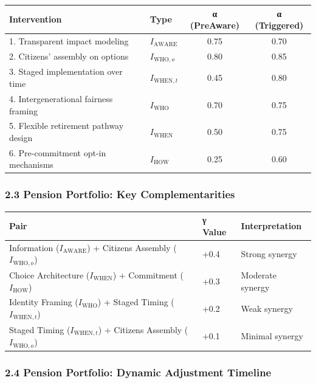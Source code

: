 \begin{center}
\begin{tabular}{@{}llcc@{}}
\toprule
\textbf{Intervention} & \textbf{Type} & \textbf{α (PreAware)} & \textbf{α (Triggered)} \\
\midrule
1. Transparent impact modeling & $I_{\text{AWARE}}$ & 0.75 & 0.70 \\
2. Citizens' assembly on options & $I_{\text{WHO},o}$ & 0.80 & 0.85 \\
3. Staged implementation over time & $I_{\text{WHEN},t}$ & 0.45 & 0.80 \\
4. Intergenerational fairness framing & $I_{\text{WHO}}$ & 0.70 & 0.75 \\
5. Flexible retirement pathway design & $I_{\text{WHEN}}$ & 0.50 & 0.75 \\
6. Pre-commitment opt-in mechanisms & $I_{\text{HOW}}$ & 0.25 & 0.60 \\
\midrule
\end{tabular}
\end{center}

\subsubsection*{2.3 Pension Portfolio: Key Complementarities}

\begin{center}
\begin{tabular}{@{}lll@{}}
\toprule
\textbf{Pair} & \textbf{γ Value} & \textbf{Interpretation} \\
\midrule
Information ($I_{\text{AWARE}}$) + Citizens Assembly ($I_{\text{WHO},o}$) & +0.4 & Strong synergy \\
Choice Architecture ($I_{\text{WHEN}}$) + Commitment ($I_{\text{HOW}}$) & +0.3 & Moderate synergy \\
Identity Framing ($I_{\text{WHO}}$) + Staged Timing ($I_{\text{WHEN},t}$) & +0.2 & Weak synergy \\
Staged Timing ($I_{\text{WHEN},t}$) + Citizens Assembly ($I_{\text{WHO},o}$) & +0.1 & Minimal synergy \\
\midrule
\end{tabular}
\end{center}

\subsubsection*{2.4 Pension Portfolio: Dynamic Adjustment Timeline}

